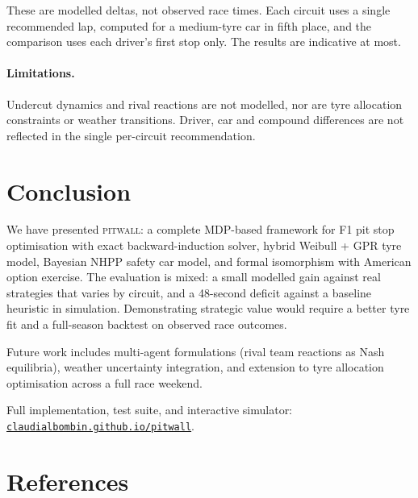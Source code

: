 \documentclass[11pt, a4paper, twocolumn]{article}
\numberwithin{equation}{section}
\theoremstyle{definition}
\begin{document}
These are modelled deltas, not observed race times. Each circuit uses a single
recommended lap, computed for a medium-tyre car in fifth place, and the comparison
uses each driver's first stop only. The results are indicative at most.

\paragraph{Limitations.}
Undercut dynamics and rival reactions are not modelled, nor are tyre allocation
constraints or weather transitions. Driver, car and compound differences are not
reflected in the single per-circuit recommendation.

\section{Conclusion}

We have presented \textsc{pitwall}: a complete MDP-based framework for F1 pit
stop optimisation with exact backward-induction solver, hybrid Weibull + GPR
tyre model, Bayesian NHPP safety car model, and
formal isomorphism with American option exercise. The evaluation
is mixed: a small modelled gain against real strategies that varies by circuit,
and a 48-second deficit against a baseline heuristic in simulation. Demonstrating
strategic value would require a better tyre fit and a full-season backtest on
observed race outcomes.

Future work includes multi-agent formulations (rival team reactions as Nash
equilibria), weather uncertainty integration, and extension to tyre allocation
optimisation across a full race weekend.

Full implementation, test suite, and interactive simulator:
\href{https://claudialbombin.github.io/pitwall}{\texttt{claudialbombin.github.io/pitwall}}.

\section*{References}
\end{document}
